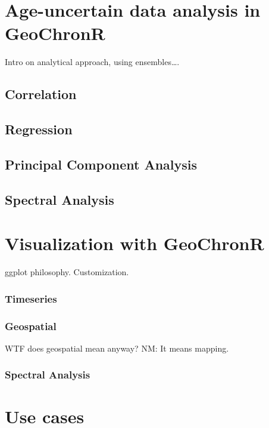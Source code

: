 \documentclass[gc, manuscript]{copernicus}
\begin{document}
\hypertarget{age-uncertain-analysis}{%
\section{Age-uncertain data analysis in
GeoChronR}\label{age-uncertain-analysis}}

Intro on analytical approach, using ensembles\ldots{}.

\subsection{Correlation}

\subsection{Regression}

\subsection{Principal Component Analysis}

\subsection{Spectral Analysis}

\section{Visualization with GeoChronR}

ggplot philosophy. Customization.

\subsubsection{Timeseries}

\subsubsection{Geospatial}

WTF does geospatial mean anyway? NM: It means mapping.

\subsubsection{Spectral Analysis}

\hypertarget{use-cases}{%
\section{Use cases}\label{use-cases}}
\end{document}

